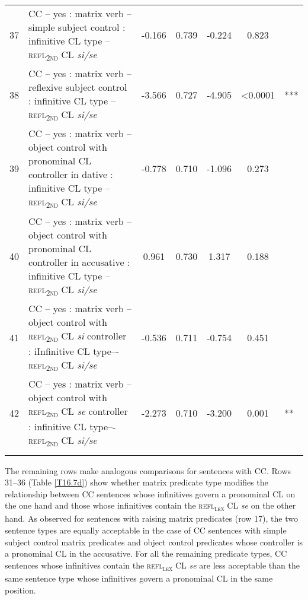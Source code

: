 \begin{sidewaystable}
\begin{tabularx}{\textwidth}{l@{~}Q S[table-format=-1.3]S[table-format=1.3]S[table-format=-1.3]S[table-format=<1.4]  @{\,}l}
37 & CC – yes : matrix verb – simple subject control : infinitive CL type – \textsc{refl\textsubscript{2nd}} CL \textit{si/se} & -0.166 &0.739 & -0.224 &0.823 & \\
38 & CC – yes : matrix verb – reflexive subject control : infinitive CL type – \textsc{refl\textsubscript{2nd}} CL \textit{si/se} &  -3.566 &0.727 & -4.905 & <0.0001 & *** \\
39 & CC – yes : matrix verb – object control with pronominal CL controller in dative : infinitive CL type – \textsc{refl\textsubscript{2nd}} CL \textit{si/se} & -0.778 &0.710& -1.096 &0.273 & \\
40 & CC – yes : matrix verb – object control with pronominal CL controller in accusative : infinitive CL type – \textsc{refl\textsubscript{2nd}} CL \textit{si/se} &0.961 &0.730 & 1.317 &0.188 & \\
41 & CC – yes : matrix verb – object control with \textsc{refl\textsubscript{2nd}} CL \textit{si} controller : iInfinitive CL type–- \textsc{refl\textsubscript{2nd}} CL \textit{si/se} & -0.536 &0.711 & -0.754 &0.451 & \\ 
42 & CC – yes : matrix verb – object control with \textsc{refl\textsubscript{2nd}} CL \textit{se} controller : infinitive CL type–- \textsc{refl\textsubscript{2nd}} CL \textit{si/se} & -2.273 &0.710 & -3.200 &0.001 & ** \\
\lspbottomrule
\end{tabularx}
\end{sidewaystable}


\hspace*{-1mm}The remaining rows make analogous comparisons for sentences with CC. Rows 31--36 (Table \ref{T16.7d}) show whether matrix predicate type modifies the relationship between CC sentences whose infinitives govern a pronominal CL on the one hand and those whose infinitives contain the \textsc{refl\textsubscript{\textsc{lex}}} CL \textit{se} on the other hand. As observed for sentences with raising matrix predicates (row 17), the two sentence types are equally acceptable in the case of CC sentences with simple subject control matrix predicates and object control predicates whose controller is a pronominal CL in the accusative. For all the remaining predicate types, CC sentences whose infinitives contain the \textsc{refl\textsubscript{\textsc{lex}}} CL \textit{se} are less acceptable than the same sentence type whose infinitives govern a pronominal CL in the same position.

